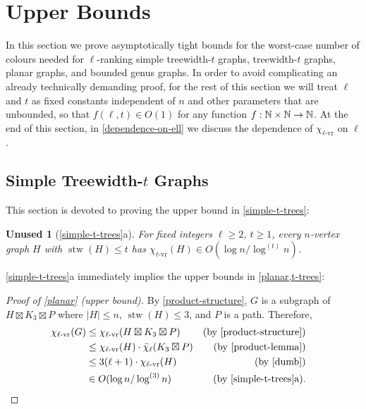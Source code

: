 \documentclass[kpfonts]{patmorin}
\DeclareMathOperator{\stw}{stw}
\newcommand{\rn}[1]{\chi_{\operatorname{#1-vr}}}
\newcommand{\lrn}{\rn{\ell}}
\newcommand{\dlcn}{\bar{\chi}_\ell}
\theoremstyle{named}
\newtheorem*{namedtheorem}{Unused}
\newcommand{\weirdref}[2]{\cref{#1}#2}
\newcommand{\weirdlabel}[2]{\label{#1-#1}}
\begin{document}
\section{Upper Bounds}
\label{upper-bounds}

In this section we prove asymptotically tight bounds for the worst-case number of colours needed for $\ell$-ranking simple treewidth-$t$ graphs, treewidth-$t$ graphs, planar graphs, and bounded genus graphs. In order to avoid complicating an already technically demanding proof, for the rest of this section we will treat $\ell$ and $t$ as fixed constants independent of $n$ and other parameters that are unbounded, so that $f(\ell,t)\in O(1)$ for any function $f:\mathbb{N}\times\mathbb{N}\to\mathbb{N}$.  At the end of this section, in \cref{dependence-on-ell} we discuss the dependence of $\lrn$ on $\ell$.


\subsection{Simple Treewidth-$t$ Graphs}
\label{simple-treewidth-section}

This section is devoted to proving the upper bound in \cref{simple-t-trees}:

\begin{namedtheorem}[\weirdref{simple-t-trees}{a}]\weirdlabel{simple-t-trees}{a}
    For fixed integers $\ell\ge 2$, $t\ge 1$, every $n$-vertex graph $H$ with $\stw(H)\le t$ has $\lrn(H)\in O(\log n/\log^{(t)} n)$.
\end{namedtheorem}

\weirdref{simple-t-trees}{a} immediately implies the upper bounds in \cref{planar,t-trees}:

\begin{proof}[Proof of \cref{planar} (upper bound)]
    By \cref{product-structure}, $G$ is a subgraph of $H\boxtimes K_3\boxtimes P$ where $|H|\le n$, $\stw(H)\le 3$, and $P$ is a path. Therefore,
    \begin{align*}
        \lrn(G) & \le \lrn(H\boxtimes K_3\boxtimes P)
                    & \text{(by \cref{product-structure})}\\
                & \le \lrn(H)\cdot \dlcn(K_3\boxtimes P)
                    & \text{(by \cref{product-lemma})} \\
                & \le 3(\ell+1)\cdot\lrn(H) & \text{(by \cref{dumb})} \\
                & \in O(\log n/\log^{(3)} n) & \text{(by \weirdref{simple-t-trees}{a}).} & \qedhere
    \end{align*}
\end{proof}
\end{document}
